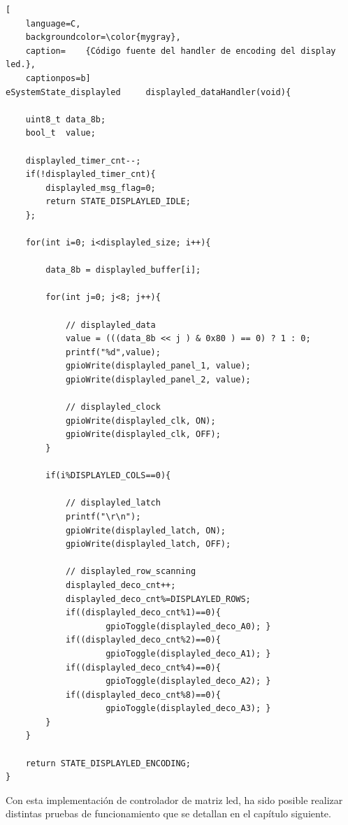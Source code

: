 \begin{lstlisting}[
	language=C, 
	backgroundcolor=\color{mygray},
	caption=	{Código fuente del handler de encoding del display led.},
	captionpos=b]
eSystemState_displayled     displayled_dataHandler(void){

    uint8_t data_8b;
    bool_t  value;

    displayled_timer_cnt--;
    if(!displayled_timer_cnt){
        displayled_msg_flag=0;
        return STATE_DISPLAYLED_IDLE;
    };    

    for(int i=0; i<displayled_size; i++){
        
        data_8b = displayled_buffer[i];
        
        for(int j=0; j<8; j++){
            
            // displayled_data 
            value = (((data_8b << j ) & 0x80 ) == 0) ? 1 : 0;
            printf("%d",value);
            gpioWrite(displayled_panel_1, value);
            gpioWrite(displayled_panel_2, value);
            
            // displayled_clock 
            gpioWrite(displayled_clk, ON);
            gpioWrite(displayled_clk, OFF);
        }
        
        if(i%DISPLAYLED_COLS==0){

            // displayled_latch 
            printf("\r\n");
            gpioWrite(displayled_latch, ON);
            gpioWrite(displayled_latch, OFF);
            
            // displayled_row_scanning
            displayled_deco_cnt++;
            displayled_deco_cnt%=DISPLAYLED_ROWS;
            if((displayled_deco_cnt%1)==0){ 
            		gpioToggle(displayled_deco_A0); }
            if((displayled_deco_cnt%2)==0){ 
            		gpioToggle(displayled_deco_A1); }
            if((displayled_deco_cnt%4)==0){ 
            		gpioToggle(displayled_deco_A2); }
            if((displayled_deco_cnt%8)==0){ 
            		gpioToggle(displayled_deco_A3); }
        }
    }
    
    return STATE_DISPLAYLED_ENCODING;
}

\end{lstlisting}

Con esta implementación de controlador de matriz led, ha sido posible realizar distintas pruebas de funcionamiento que se detallan en el capítulo siguiente.\\
